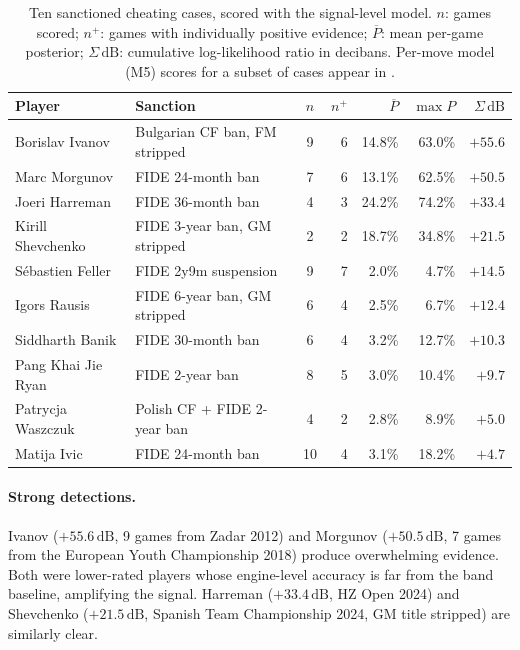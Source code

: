 \documentclass[11pt,a4paper]{article}
\newcommand{\dB}{\,\mathrm{dB}}
\theoremstyle{definition}
\begin{document}
\begin{table}[t]
  \centering
  \caption{Ten sanctioned cheating cases, scored with the signal-level
    model.  $n$: games scored;
    $n^+$: games with individually positive evidence;
    $\overline{P}$: mean per-game posterior;
    $\Sigma\dB$: cumulative log-likelihood ratio in decibans.
    Per-move model (M5) scores for a subset of cases appear in
    .}
  \label{tab:cases}
  \smallskip
  \small
  \begin{tabular}{@{}llcrrrr@{}}
    \toprule
    Player & Sanction & $n$ & $n^+$ & $\overline{P}$ & $\max P$ & $\Sigma\dB$ \\
    \midrule
    Borislav Ivanov      & Bulgarian CF ban, FM stripped        & 9  & 6 & 14.8\% & 63.0\% & $+55.6$ \\
    Marc Morgunov        & FIDE 24-month ban                    & 7  & 6 & 13.1\% & 62.5\% & $+50.5$ \\
    Joeri Harreman       & FIDE 36-month ban                    & 4  & 3 & 24.2\% & 74.2\% & $+33.4$ \\
    Kirill Shevchenko    & FIDE 3-year ban, GM stripped         & 2  & 2 & 18.7\% & 34.8\% & $+21.5$ \\
    S\'ebastien Feller   & FIDE 2y9m suspension                 & 9  & 7 &  2.0\% &  4.7\% & $+14.5$ \\
    Igors Rausis         & FIDE 6-year ban, GM stripped         & 6  & 4 &  2.5\% &  6.7\% & $+12.4$ \\
    Siddharth Banik      & FIDE 30-month ban                    & 6  & 4 &  3.2\% & 12.7\% & $+10.3$ \\
    Pang Khai Jie Ryan   & FIDE 2-year ban                      & 8  & 5 &  3.0\% & 10.4\% & $+9.7$  \\
    Patrycja Waszczuk    & Polish CF + FIDE 2-year ban          & 4  & 2 &  2.8\% &  8.9\% & $+5.0$  \\
    Matija Ivic          & FIDE 24-month ban                    & 10 & 4 &  3.1\% & 18.2\% & $+4.7$  \\
    \bottomrule
  \end{tabular}
\end{table}

\paragraph{Strong detections.}
Ivanov ($+55.6\dB$, 9 games from Zadar 2012) and Morgunov ($+50.5\dB$,
7 games from the European Youth Championship 2018) produce overwhelming
evidence.  Both were lower-rated players whose engine-level accuracy
is far from the band baseline, amplifying the signal.  Harreman
($+33.4\dB$, HZ Open 2024) and Shevchenko ($+21.5\dB$, Spanish Team
Championship 2024, GM title stripped) are similarly clear.
\end{document}
